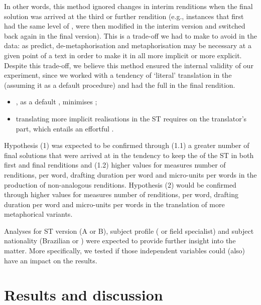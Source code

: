 \documentclass[output=paper]{LSP/langsci}
\begin{document}
  
In other words, this method ignored changes in interim renditions when the final solution was arrived at the third or further rendition (e.g., instances that first had the same level of , were then modified in the interim version and switched back again in the final version). This is a trade-off we had to make to avoid  in the data: as \citet{Halliday1999, Steiner2001Intralingual, Steiner2001Translations} predict, de-meta\-phor\-i\-sa\-tion and metaphorisation may be necessary at a given point of a text in order to make it in all more implicit or more explicit. Despite this trade-off, we believe this method ensured the internal validity of our experiment, since we worked with a tendency of `literal' translation in the  (assuming it as a default procedure) and had the full  in the final rendition.

\begin{itemize}
\item {}, as a default , minimises ; 
\item translating more implicit realisations in the ST requires  on the translator's part, which entails an effortful .
\end{itemize}

Hypothesis (1) was expected to be confirmed through (1.1) a greater number of final solutions that were arrived at in the  tendency to keep the  of the ST in both first and final renditions and (1.2) higher values for measures number of renditions,  per word, drafting duration per word and micro-units per words in the production of non-analogous renditions. Hypothesis (2) would be confirmed through higher values for measures number of renditions,  per word, drafting duration per word and micro-units per words in the translation of more metaphorical variants. 


Analyses for ST version (A or B), subject profile ( or field specialist) and subject nationality (Brazilian or ) were expected to provide further insight into the matter. More specifically, we tested if those independent variables could (also) have an impact on the results.

\section{Results and discussion}
\end{document}
